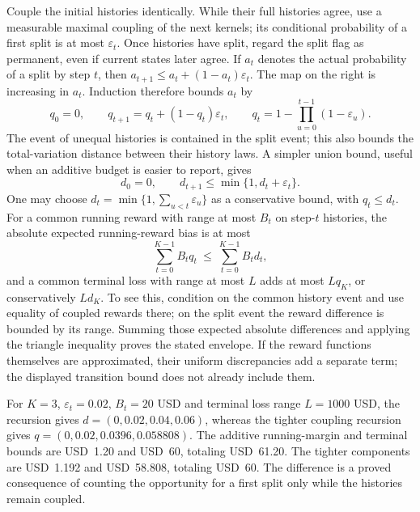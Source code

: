 Couple the initial histories identically. While their full histories agree,
use a measurable maximal coupling of the next kernels; its conditional
probability of a first split is at most $\varepsilon_t$. Once histories have
split, regard the split flag as permanent, even if current states later agree.
If $a_t$ denotes the actual probability of a split by step $t$, then
$a_{t+1}\leq a_t+(1-a_t)\varepsilon_t$. The map on the right is increasing
in $a_t$. Induction therefore bounds $a_t$ by
\begin{equation}
 q_0=0,\qquad q_{t+1}=q_t+(1-q_t)\varepsilon_t,
 \qquad q_t=1-\prod_{u=0}^{t-1}(1-\varepsilon_u).
 \label{exec17:s5-coupling-recursion}
\end{equation}
The event of unequal histories is contained in the split event; this also
bounds the total-variation distance between their history laws. A simpler
union bound, useful when an additive budget is easier to report, gives
\begin{equation}
 d_0=0,\qquad d_{t+1}\leq\min\{1,d_t+\varepsilon_t\}.
 \label{exec17:s5-tv-recursion}
\end{equation}
One may choose $d_t=\min\{1,\sum_{u<t}\varepsilon_u\}$ as a conservative
bound, with $q_t\leq d_t$. For a common running reward with range at most
$B_t$ on step-$t$ histories, the absolute
expected running-reward bias is at most
\begin{equation}
 \sum_{t=0}^{K-1}B_t q_t\ \leq\ \sum_{t=0}^{K-1}B_t d_t,
 \label{exec17:s5-running-bound}
\end{equation}
and a common terminal loss with range at most $L$ adds at most $Lq_K$,
or conservatively $Ld_K$. To see this,
condition on the common history event and use equality of coupled rewards
there; on the split event the reward difference is bounded by its range.
Summing those expected absolute differences and applying the triangle
inequality proves the stated envelope. If the reward functions themselves
are approximated, their uniform discrepancies add a separate term; the
displayed transition bound does not already include them.

For $K=3$, $\varepsilon_t=0.02$, $B_t=20$ USD and terminal loss range
$L=1000$ USD, the recursion gives
$d=(0,0.02,0.04,0.06)$, whereas the tighter coupling recursion gives
$q=(0,0.02,0.0396,0.058808)$. The additive running-margin and terminal
bounds are USD~1.20 and USD~60, totaling USD~61.20. The tighter components
are USD~1.192 and USD~58.808, totaling USD~60. The difference is a proved
consequence of counting the opportunity for a first split only while the
histories remain coupled.~\citep{exec17_s5_joint_error}

